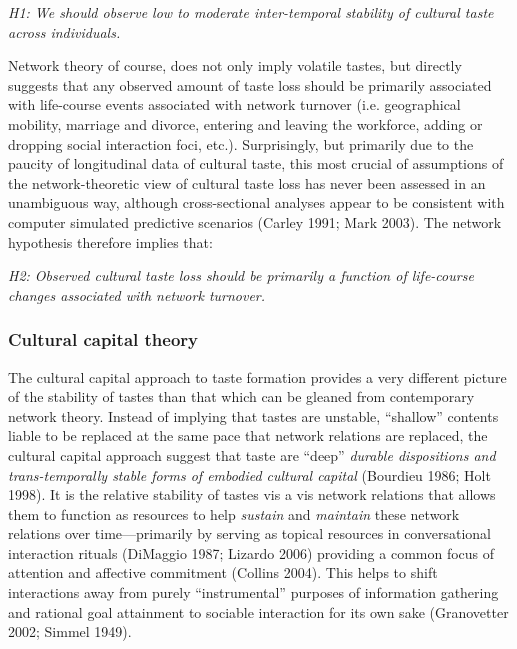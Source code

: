 \documentclass[
]{article}
\begin{document}
\emph{H1: We should observe low to moderate inter-temporal stability of cultural taste across individuals.}

Network theory of course, does not only imply volatile tastes, but directly suggests that any observed amount of taste loss should be primarily associated with life-course events associated with network turnover (i.e. geographical mobility, marriage and divorce, entering and leaving the workforce, adding or dropping social interaction foci, etc.). Surprisingly, but primarily due to the paucity of longitudinal data of cultural taste, this most crucial of assumptions of the network-theoretic view of cultural taste loss has never been assessed in an unambiguous way, although cross-sectional analyses appear to be consistent with computer simulated predictive scenarios (Carley 1991; Mark 2003). The network hypothesis therefore implies that:

\emph{H2: Observed cultural taste loss should be primarily a function of life-course changes associated with network turnover.}

\subsubsection{Cultural capital theory}\label{cultural-capital-theory}

The cultural capital approach to taste formation provides a very different picture of the stability of tastes than that which can be gleaned from contemporary network theory. Instead of implying that tastes are unstable, ``shallow'' contents liable to be replaced at the same pace that network relations are replaced, the cultural capital approach suggest that taste are ``deep'' \emph{durable dispositions and trans-temporally stable forms of embodied cultural capital} (Bourdieu 1986; Holt 1998). It is the relative stability of tastes vis a vis network relations that allows them to function as resources to help \emph{sustain} and \emph{maintain} these network relations over time---primarily by serving as topical resources in conversational interaction rituals (DiMaggio 1987; Lizardo 2006) providing a common focus of attention and affective commitment (Collins 2004). This helps to shift interactions away from purely ``instrumental'' purposes of information gathering and rational goal attainment to sociable interaction for its own sake (Granovetter 2002; Simmel 1949).
\end{document}
